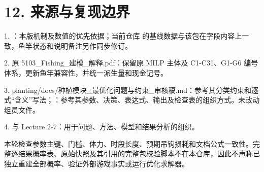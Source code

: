\documentclass[11pt,a4paper]{article}
\begin{document}
\section*{\color{modelblue}12. 来源与复现边界}

1. ：本版机制及数值的优先依据；当前仓库  的基线数据与该包在字段内容上一致，鱼竿状态和说明备注另作同步修订。\par
2. 原 {\small 5103\_Fishing\_建模\_解释.pdf}：保留原 MILP 主体及 C1-C31、G1-G6 编号体系，更新鱼竿兼容性，并统一派生量和现金记号。\par
3. {\small planting/docs/种植模块\_最优化问题与约束\_审核稿.md}：参考其分类约束和逐式“含义”写法；：参考其参数、决策、表达式、输出及检查表的组织方式。未改动组员文件。\par
4.  与 Lecture 2-7：用于问题、方法、模型和结果分析的组织。\par

本轮检查参数主键、门槛、体力、时段长度、预期吊钩损耗和文档公式一致性。完整逐结果概率表、原始快照及其引用的完整包校验脚本不在本仓库，因此不声称已独立重建全部概率、验证外部游戏事实或运行优化求解器。\par
\end{document}

